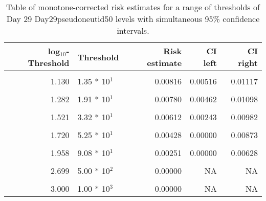 \documentclass[]{article}
\begin{document}
\begin{table}[!h]

\caption{\label{tab:unnamed-chunk-50}Table of monotone-corrected risk estimates for a range of thresholds of Day 29 Day29pseudoneutid50 levels with simultaneous 95\% confidence intervals.}
\centering
\begin{tabular}[t]{rlrrr}
\toprule
log$_{10}$-Threshold & Threshold & Risk estimate & CI left & CI right\\
\midrule
\cellcolor{gray!6}{0.083} & \cellcolor{gray!6}{1.21 * 10$^{0}$} & \cellcolor{gray!6}{0.00855} & \cellcolor{gray!6}{0.00570} & \cellcolor{gray!6}{0.01140}\\
1.130 & 1.35 * 10$^{1}$ & 0.00816 & 0.00516 & 0.01117\\
\cellcolor{gray!6}{1.204} & \cellcolor{gray!6}{1.60 * 10$^{1}$} & \cellcolor{gray!6}{0.00816} & \cellcolor{gray!6}{0.00512} & \cellcolor{gray!6}{0.01121}\\
1.282 & 1.91 * 10$^{1}$ & 0.00780 & 0.00462 & 0.01098\\
\cellcolor{gray!6}{1.423} & \cellcolor{gray!6}{2.65 * 10$^{1}$} & \cellcolor{gray!6}{0.00655} & \cellcolor{gray!6}{0.00348} & \cellcolor{gray!6}{0.00962}\\
1.521 & 3.32 * 10$^{1}$ & 0.00612 & 0.00243 & 0.00982\\
\cellcolor{gray!6}{1.613} & \cellcolor{gray!6}{4.10 * 10$^{1}$} & \cellcolor{gray!6}{0.00547} & \cellcolor{gray!6}{0.00127} & \cellcolor{gray!6}{0.00968}\\
1.720 & 5.25 * 10$^{1}$ & 0.00428 & 0.00000 & 0.00873\\
\cellcolor{gray!6}{1.891} & \cellcolor{gray!6}{7.78 * 10$^{1}$} & \cellcolor{gray!6}{0.00354} & \cellcolor{gray!6}{0.00000} & \cellcolor{gray!6}{0.00848}\\
1.958 & 9.08 * 10$^{1}$ & 0.00251 & 0.00000 & 0.00628\\
\cellcolor{gray!6}{2.047} & \cellcolor{gray!6}{1.11 * 10$^{2}$} & \cellcolor{gray!6}{0.00247} & \cellcolor{gray!6}{0.00000} & \cellcolor{gray!6}{0.00543}\\
2.699 & 5.00 * 10$^{2}$ & 0.00000 & NA & NA\\
\cellcolor{gray!6}{2.828} & \cellcolor{gray!6}{6.73 * 10$^{2}$} & \cellcolor{gray!6}{0.00000} & \cellcolor{gray!6}{NA} & \cellcolor{gray!6}{NA}\\
3.000 & 1.00 * 10$^{3}$ & 0.00000 & NA & NA\\
\bottomrule
\end{tabular}
\end{table}
\end{document}
